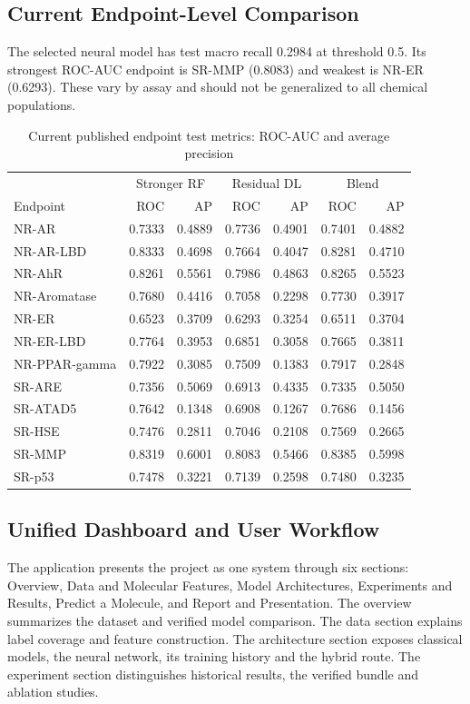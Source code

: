 \documentclass[conference]{IEEEtran}
\begin{document}
\subsection{Current Endpoint-Level Comparison}
The selected neural model has test macro recall 0.2984 at threshold 0.5. Its strongest ROC-AUC endpoint is SR-MMP (0.8083) and weakest is NR-ER (0.6293). These vary by assay and should not be generalized to all chemical populations.
\begin{table}[t]\centering\small
\caption{Current published endpoint test metrics: ROC-AUC and average precision}
\label{tab:endpoints}
\begin{tabular}{lrrrrrr}\toprule
&\multicolumn{2}{c}{Stronger RF}&\multicolumn{2}{c}{Residual DL}&\multicolumn{2}{c}{Blend}\\
Endpoint & ROC & AP & ROC & AP & ROC & AP\\\midrule
NR-AR & 0.7333 & 0.4889 & 0.7736 & 0.4901 & 0.7401 & 0.4882\\
NR-AR-LBD & 0.8333 & 0.4698 & 0.7664 & 0.4047 & 0.8281 & 0.4710\\
NR-AhR & 0.8261 & 0.5561 & 0.7986 & 0.4863 & 0.8265 & 0.5523\\
NR-Aromatase & 0.7680 & 0.4416 & 0.7058 & 0.2298 & 0.7730 & 0.3917\\
NR-ER & 0.6523 & 0.3709 & 0.6293 & 0.3254 & 0.6511 & 0.3704\\
NR-ER-LBD & 0.7764 & 0.3953 & 0.6851 & 0.3058 & 0.7665 & 0.3811\\
NR-PPAR-gamma & 0.7922 & 0.3085 & 0.7509 & 0.1383 & 0.7917 & 0.2848\\
SR-ARE & 0.7356 & 0.5069 & 0.6913 & 0.4335 & 0.7335 & 0.5050\\
SR-ATAD5 & 0.7642 & 0.1348 & 0.6908 & 0.1267 & 0.7686 & 0.1456\\
SR-HSE & 0.7476 & 0.2811 & 0.7046 & 0.2108 & 0.7569 & 0.2665\\
SR-MMP & 0.8319 & 0.6001 & 0.8083 & 0.5466 & 0.8385 & 0.5998\\
SR-p53 & 0.7478 & 0.3221 & 0.7139 & 0.2598 & 0.7480 & 0.3235\\
\bottomrule\end{tabular}\end{table}

\subsection{Unified Dashboard and User Workflow}
The application presents the project as one system through six sections: Overview, Data and Molecular Features, Model Architectures, Experiments and Results, Predict a Molecule, and Report and Presentation. The overview summarizes the dataset and verified model comparison. The data section explains label coverage and feature construction. The architecture section exposes classical models, the neural network, its training history and the hybrid route. The experiment section distinguishes historical results, the verified bundle and ablation studies.
\end{document}
